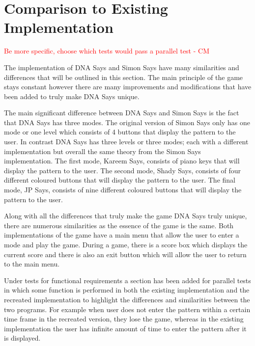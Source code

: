 \documentclass[12pt, titlepage]{article}
\begin{document}
\section{Comparison to Existing Implementation}	
\textcolor{red}{Be more specific, choose which tests would pass a parallel test - CM} \\
\par The implementation of DNA Says and Simon Says have many similarities and differences that will be outlined in this section. The main principle of the game stays constant however there are many improvements and modifications that have been added to truly make DNA Says unique. 
\\
\par The main significant difference between DNA Says and Simon Says is the fact that DNA Says has three modes. The original version of Simon Says only has one mode or one level which consists of 4 buttons that display the pattern to the user. In contrast DNA Says has three levels or three modes; each with a different implementation but overall the same theory from the Simon Says implementation. The first mode, Kareem Says, consists of piano keys that will display the pattern to the user. The second mode, Shady Says, consists of four different coloured buttons that will display the pattern to the user. The final mode, JP Says, consists of nine different coloured buttons that will display the pattern to the user. 
\\
\par Along with all the differences that truly make the game DNA Says truly unique, there are numerous similarities as the essence of the game is the same. Both implementations of the game have a main menu that allow the user to enter a mode and play the game. During a game, there is a score box which displays the current score and there is also an exit button which will allow the user to return to the main menu.  
\\
\par Under tests for functional requirements a section has been added for parallel tests in which some function is performed in both the existing implementation and the recreated implementation to highlight the differences and similarities between the two programs. For example when user does not enter the pattern within a certain time frame in the recreated version, they lose the game, whereas in the existing implementation the user has infinite amount of time to enter the pattern after it is displayed.
				
\end{document}
